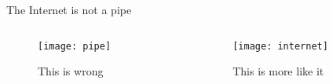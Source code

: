 \begin{frame}{The Internet is not a pipe}


\begin{columns}[T]
  \begin{column}{.3\textwidth}
    \begin{block}{}


\begin{figure}[htbp!]
  \begin{center}
    \texttt{[image: pipe]}
    \caption*{\tiny{This is wrong}}
   \end{center}
\end{figure}

    \end{block}
  \end{column}
  \begin{column}{.7\textwidth}
    \begin{block}{}
    
\begin{figure}[htbp!]
  \begin{center}
    \texttt{[image: internet]}
    \caption*{\tiny{This is more like it}}
   \end{center}
\end{figure}

    \end{block}
  \end{column}
\end{columns}

\end{frame}